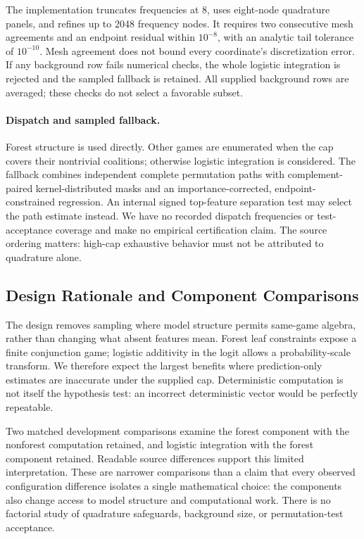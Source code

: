 \documentclass{article}
\begin{document}
The implementation truncates frequencies at 8, uses eight-node quadrature panels, and refines up to 2048 frequency nodes. It requires two consecutive mesh agreements and an endpoint residual within $10^{-8}$, with an analytic tail tolerance of $10^{-10}$. Mesh agreement does not bound every coordinate's discretization error. If any background row fails numerical checks, the whole logistic integration is rejected and the sampled fallback is retained. All supplied background rows are averaged; these checks do not select a favorable subset.

\paragraph{Dispatch and sampled fallback.}
Forest structure is used directly. Other games are enumerated when the cap covers their nontrivial coalitions; otherwise logistic integration is considered. The fallback combines independent complete permutation paths with complement-paired kernel-distributed masks and an importance-corrected, endpoint-constrained regression. An internal signed top-feature separation test may select the path estimate instead. We have no recorded dispatch frequencies or test-acceptance coverage and make no empirical certification claim. The source ordering matters: high-cap exhaustive behavior must not be attributed to quadrature alone.

\subsection{Design Rationale and Component Comparisons}
The design removes sampling where model structure permits same-game algebra, rather than changing what absent features mean. Forest leaf constraints expose a finite conjunction game; logistic additivity in the logit allows a probability-scale transform. We therefore expect the largest benefits where prediction-only estimates are inaccurate under the supplied cap. Deterministic computation is not itself the hypothesis test: an incorrect deterministic vector would be perfectly repeatable.

Two matched development comparisons examine the forest component with the nonforest computation retained, and logistic integration with the forest component retained. Readable source differences support this limited interpretation. These are narrower comparisons than a claim that every observed configuration difference isolates a single mathematical choice: the components also change access to model structure and computational work. There is no factorial study of quadrature safeguards, background size, or permutation-test acceptance.
\end{document}
